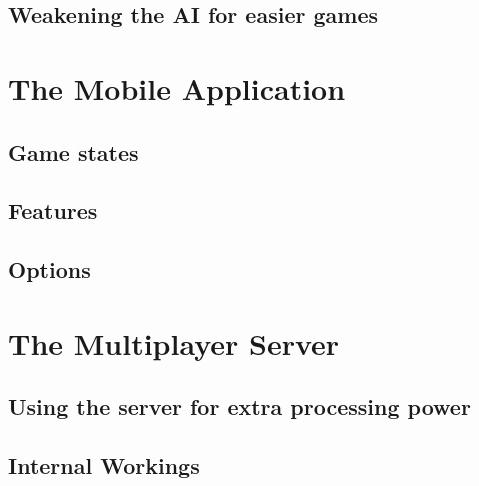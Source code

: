\documentclass[11pt]{report}
\begin{document}
\section{Weakening the AI for easier games}


\chapter{The Mobile Application}

\section{Game states}

\section{Features}

\section{Options}

\chapter{The Multiplayer Server}

\section{Using the server for extra processing power}

\section{Internal Workings}
\end{document}
